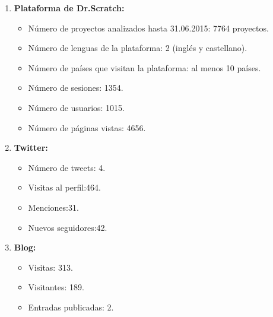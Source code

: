 \documentclass[a4paper,12pt]{letter}
\begin{document}
\begin{letter}
\begin{enumerate}  
    \item {\textbf{Plataforma de Dr.Scratch:}}
        \begin{itemize}
            \item {Número de proyectos analizados hasta 31.06.2015: 7764 proyectos.}
            \item {Número de lenguas de la plataforma: 2 (inglés y castellano).}
            \item {Número de países que visitan la plataforma: al menos 10 países.}
            \item {Número de sesiones: 1354.}
            \item {Número de usuarios: 1015.}
            \item {Número de páginas vistas: 4656.}
        \end{itemize}
    \item {\textbf{Twitter:}}
        \begin{itemize}
            \item {Número de tweets: 4.}
            \item {Visitas al perfil:464.}
            \item {Menciones:31.}
            \item {Nuevos seguidores:42.}
        \end{itemize}
    \item {\textbf{Blog:}}
        \begin{itemize}
            \item {Visitas: 313.}
            \item {Visitantes: 189.}
            \item {Entradas publicadas: 2.}
        \end{itemize}

\end{enumerate}

\end{letter}
\end{document}
